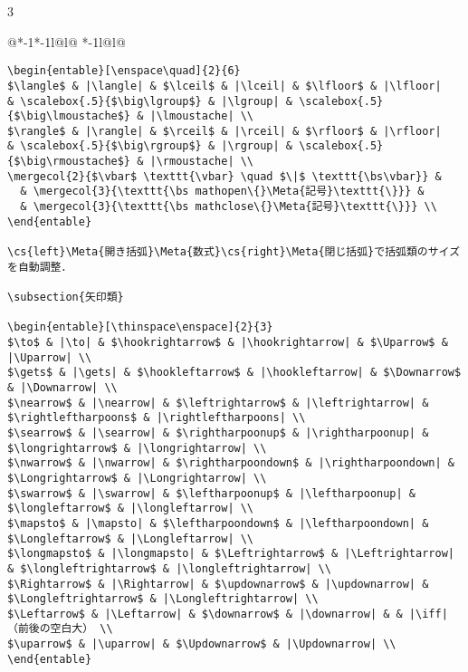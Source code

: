 \documentclass[10pt,a4paper,landscape,dvipdfmx]{jarticle}
\makeatletter
\def\set@etsep#1#2{\def\etcolsep{#1}\def\etitemsep{#2}}
\newenvironment{entable}[3][\quad\qquad]{%
  \set@etsep#1\relax\relax
  \begin{tabular}{%
    @{}*{\the\numexpr#3-1}{*{\the\numexpr#2-1}{l@{\etcolsep}}l@{\etitemsep}}%
    *{\the\numexpr#2-1}{l@{\etcolsep}}l@{}}}{%
  \end{tabular}}
\newcommand{\mergecol}[2]{\multicolumn{#1}{@{}l@{}}{#2}}
\newcommand*\eghostguarded{%
  \ifmmode \expandafter\@firstofone
  \else \expandafter\pxqgg@eghostguarded@a
  \fi}
\def\pxqgg@eghostguarded@a#1{%
  {\pxqgg@TI\pxqgg@cwm}%
  #1%
  {\pxqgg@TI\pxqgg@cwm}}
\newcommand{\codefont}{\ttfamily\gtfamily}
\newcommand{\cs}[1]{\eghostguarded{{\codefont \bs #1}}}
\newcommand{\Meta}[1]{$\langle$\mbox{}\emph{#1}\mbox{}$\rangle$}
\makeatother
\begin{document}
\begin{multicols}{3}
\begin{entable}[\enspace]{2}{1}
\begin{verbatim}
\begin{entable}[\enspace\quad]{2}{6}
$\langle$ & |\langle| & $\lceil$ & |\lceil| & $\lfloor$ & |\lfloor| 
& \scalebox{.5}{$\big\lgroup$} & |\lgroup| & \scalebox{.5}{$\big\lmoustache$} & |\lmoustache| \\
$\rangle$ & |\rangle| & $\rceil$ & |\rceil| & $\rfloor$ & |\rfloor| 
& \scalebox{.5}{$\big\rgroup$} & |\rgroup| & \scalebox{.5}{$\big\rmoustache$} & |\rmoustache| \\
\mergecol{2}{$\vbar$ \texttt{\vbar} \quad $\|$ \texttt{\bs\vbar}} &
  & \mergecol{3}{\texttt{\bs mathopen\{}\Meta{記号}\texttt{\}}} &
  & \mergecol{3}{\texttt{\bs mathclose\{}\Meta{記号}\texttt{\}}} \\
\end{entable}

\cs{left}\Meta{開き括弧}\Meta{数式}\cs{right}\Meta{閉じ括弧}で括弧類のサイズを自動調整．

\subsection{矢印類}

\begin{entable}[\thinspace\enspace]{2}{3}
$\to$ & |\to| & $\hookrightarrow$ & |\hookrightarrow| & $\Uparrow$ & |\Uparrow| \\
$\gets$ & |\gets| & $\hookleftarrow$ & |\hookleftarrow| & $\Downarrow$ & |\Downarrow| \\
$\nearrow$ & |\nearrow| & $\leftrightarrow$ & |\leftrightarrow| & $\rightleftharpoons$ & |\rightleftharpoons| \\
$\searrow$ & |\searrow| & $\rightharpoonup$ & |\rightharpoonup| & $\longrightarrow$ & |\longrightarrow| \\
$\nwarrow$ & |\nwarrow| & $\rightharpoondown$ & |\rightharpoondown| & $\Longrightarrow$ & |\Longrightarrow| \\
$\swarrow$ & |\swarrow| & $\leftharpoonup$ & |\leftharpoonup| & $\longleftarrow$ & |\longleftarrow| \\
$\mapsto$ & |\mapsto| & $\leftharpoondown$ & |\leftharpoondown| & $\Longleftarrow$ & |\Longleftarrow| \\
$\longmapsto$ & |\longmapsto| & $\Leftrightarrow$ & |\Leftrightarrow| & $\longleftrightarrow$ & |\longleftrightarrow| \\
$\Rightarrow$ & |\Rightarrow| & $\updownarrow$ & |\updownarrow| & $\Longleftrightarrow$ & |\Longleftrightarrow| \\
$\Leftarrow$ & |\Leftarrow| & $\downarrow$ & |\downarrow| & & |\iff|（前後の空白大） \\
$\uparrow$ & |\uparrow| & $\Updownarrow$ & |\Updownarrow| \\
\end{entable}


\end{verbatim}
\end{entable}
\end{multicols}
\end{document}
